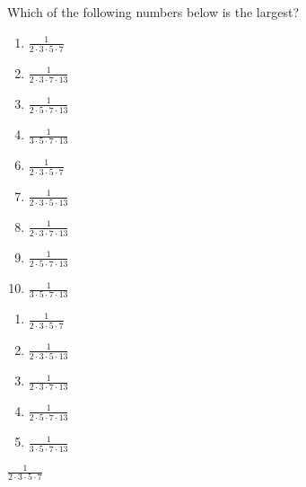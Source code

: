 

  Which of the following numbers below is the largest?


\ifsat
	\begin{enumerate}[label=\Alph*)]
		\item   $\frac{1}{2\cdot 3\cdot 5 \cdot 7}$%
		\item  $\frac{1}{2\cdot 3 \cdot 7\cdot 13}$
		\item  $\frac{1}{2\cdot 5 \cdot 7\cdot 13}$
		\item  $\frac{1}{3\cdot 5 \cdot 7\cdot 13}$
	\end{enumerate}
\else
\fi

\ifacteven
	\begin{enumerate}[label=\textbf{\Alph*.},itemsep=\fill,align=left]
		\setcounter{enumii}{5}
		\item   $\frac{1}{2\cdot 3\cdot 5 \cdot 7}$%
		\item  $\frac{1}{2\cdot 3\cdot 5 \cdot 13}$
		\item  $\frac{1}{2\cdot 3 \cdot 7\cdot 13}$
		\addtocounter{enumii}{1}
		\item  $\frac{1}{2\cdot 5 \cdot 7\cdot 13}$
		\item  $\frac{1}{3\cdot 5 \cdot 7\cdot 13}$
	\end{enumerate}
\else
\fi

\ifactodd
	\begin{enumerate}[label=\textbf{\Alph*.},itemsep=\fill,align=left]
		\item   $\frac{1}{2\cdot 3\cdot 5 \cdot 7}$%
		\item  $\frac{1}{2\cdot 3\cdot 5 \cdot 13}$
		\item  $\frac{1}{2\cdot 3 \cdot 7\cdot 13}$
		\item  $\frac{1}{2\cdot 5 \cdot 7\cdot 13}$
		\item  $\frac{1}{3\cdot 5 \cdot 7\cdot 13}$
	\end{enumerate}
\else
\fi

\ifgridin
   $\frac{1}{2\cdot 3\cdot 5 \cdot 7}$%
		
\else
\fi

